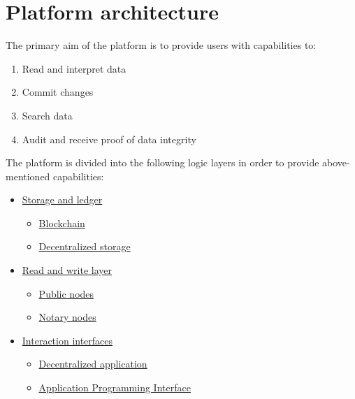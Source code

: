 \documentclass[12pt]{report}
\newcommand{\hlc}[1]{\colorbox{white!25}{#1}}
\begin{document}
\section{Platform architecture}
\label{tech-arch}
The primary aim of the platform is to provide users with capabilities to:
\begin{enumerate}
\item Read and interpret data
\item \hlc{Commit} changes
\item Search data
\item Audit and receive proof of data \hlc{integrity}
\end{enumerate}
The platform is divided into the following logic layers in order to provide above-mentioned capabilities:
\begin{itemize}
	\item \hyperref[tech-arch-underlayer]{Storage and \hlc{ledger}}
	\begin{itemize}
		\item \hyperref[tech-blockchain]{Blockchain}
		\item \hyperref[tech-storage]{Decentralized storage}
	\end{itemize}
	\item \hyperref[tech-arch-connect]{Read and write \hlc{layer}}
	\begin{itemize}
		\item \hyperref[tech-arch-connect-nodes]{Public nodes}
		\item \hyperref[tech-arch-connect-validators]{Notary nodes}
	\end{itemize}
	\item \hyperref[tech-arch-interfaces]{Interaction interfaces}
	\begin{itemize}
		\item \hyperref[tech-arch-interfaces-dapp]{Decentralized application}
		\item \hyperref[tech-arch-interfaces-api]{Application Programming Interface}
	\end{itemize}
\end{itemize}

\def\Interface{Interaction Interface}
\def\Connect{Access layer}
\def\Underlayer{Storage and ledger layer}

\def\DApps{Decentralized Applications}
\def\Api{API}
\def\Requests{Direct \hlc{requests}}
\end{document}
